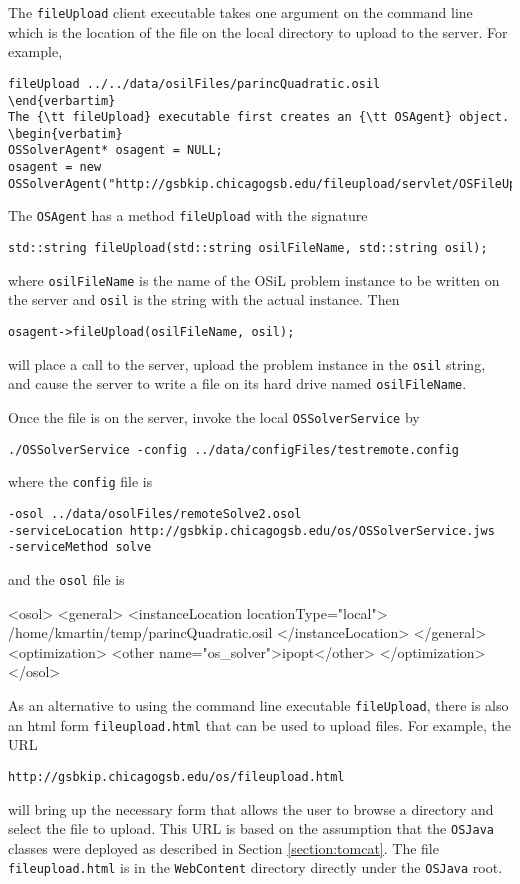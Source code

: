 \documentclass[11pt]{article}
\renewcommand{\_}{{\char"5F}}
\renewcommand{\{}{{\char"7B}}
\renewcommand{\}}{{\char"7D}}
\renewcommand{\^}{{\char"0D}}
\renewcommand{\'}{{\char"0D}}
\begin{document}
The {\tt fileUpload} client executable takes one argument on the command line which is the location of the file on the local directory to upload to the server. For example,
\begin{verbatim}
fileUpload ../../data/osilFiles/parincQuadratic.osil
\end{verbartim}
The {\tt fileUpload} executable first creates an {\tt OSAgent} object.
\begin{verbatim}
OSSolverAgent* osagent = NULL;
osagent = new OSSolverAgent("http://gsbkip.chicagogsb.edu/fileupload/servlet/OSFileUpload");
\end{verbatim}
The {\tt OSAgent}  has a method {\tt fileUpload} with the signature
\begin{verbatim}
std::string fileUpload(std::string osilFileName, std::string osil);
\end{verbatim}
where {\tt osilFileName} is  the name of the OSiL problem instance to be written on the server and {\tt osil} is the string with the actual instance. Then 
\begin{verbatim}
osagent->fileUpload(osilFileName, osil);
\end{verbatim}
will place a call to the server, upload the problem instance in the {\tt osil} string, and cause the server to write a file on its hard drive named {\tt osilFileName}.

Once the file is on the server, invoke the local {\tt OSSolverService} by
\begin{verbatim}
./OSSolverService -config ../data/configFiles/testremote.config
\end{verbatim}
where the {\tt config} file is
\begin{verbatim}
-osol ../data/osolFiles/remoteSolve2.osol
-serviceLocation http://gsbkip.chicagogsb.edu/os/OSSolverService.jws
-serviceMethod solve
\end{verbatim}
and the {\tt osol} file is
\begin{verbatimtab}[5]
<osol>
    <general>
         <instanceLocation locationType="local">
         	/home/kmartin/temp/parincQuadratic.osil
         </instanceLocation>  
    </general>
    <optimization>
    	<other name="os_solver">ipopt</other>
    </optimization>
</osol>
\end{verbatimtab}

As an alternative to using the command line executable {\tt fileUpload}, there is also an html form {\tt fileupload.html} that can be used to upload files. For example, the URL
\begin{verbatim}
http://gsbkip.chicagogsb.edu/os/fileupload.html
\end{verbatim}
will bring up the necessary form that allows the user to browse a directory and select the file to upload. This URL is based on the assumption that the {\tt OSJava} classes were deployed as described in Section \ref{section:tomcat}. The file {\tt fileupload.html} is in the {\tt WebContent} directory directly under the 
{\tt OSJava} root. 
\end{document}

